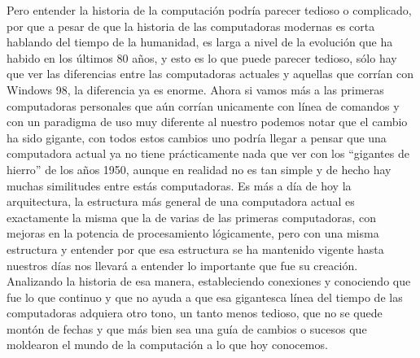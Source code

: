 \documentclass[letterpaper,12pt,oneside]{book}
\begin{document}
	Pero entender la historia de la computación podría parecer tedioso o complicado, 
	por que a pesar de que la historia de las computadoras modernas es corta hablando del tiempo
	de la humanidad, es larga a nivel de la evolución que ha habido en los últimos 80 años, y esto es lo que puede parecer tedioso, sólo hay que ver las diferencias entre
	las computadoras actuales y aquellas que corrían con Windows 98, la diferencia ya es enorme. Ahora si vamos más  a las primeras computadoras personales
	que aún corrían unicamente con línea de comandos y con un paradigma de uso muy diferente al nuestro podemos notar que el cambio ha sido gigante, con todos estos
	cambios uno podría llegar a pensar que una computadora actual ya no tiene prácticamente nada que ver con los ``gigantes de hierro'' de los años 1950, 
	aunque en realidad no es tan simple y de hecho hay muchas similitudes entre estás computadoras. Es más a día de hoy la arquitectura, la estructura
	más general de una computadora actual es exactamente la misma que la de varias de las primeras computadoras, con mejoras en la potencia de
	procesamiento lógicamente, pero con una misma estructura y entender por que esa estructura se ha mantenido vigente hasta nuestros días nos
	llevará a entender lo importante que fue su creación. Analizando la historia de esa manera, estableciendo conexiones y conociendo que fue lo que continuo
	y que no ayuda a que esa gigantesca línea del tiempo de las computadoras adquiera otro tono, un tanto menos tedioso, que no se quede
	montón de fechas y que más bien sea una guía de cambios o sucesos que moldearon el mundo de la computación a lo que hoy conocemos.
	
\end{document}
